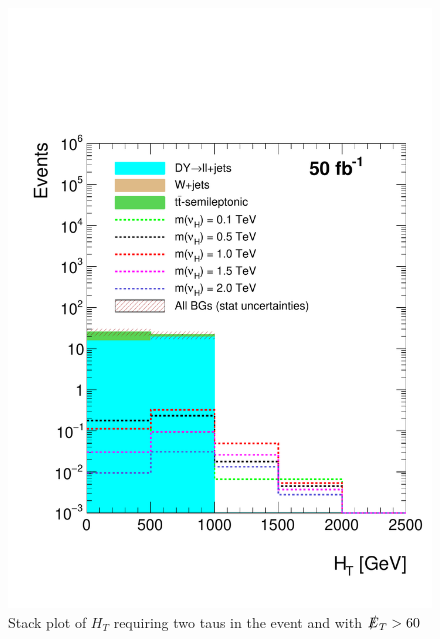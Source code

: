 \begin{figure}[H]
\centering
\includegraphics[width=\linewidth]{StackPlots/HT_2Taus_met60_50ifb_2moreSignals.pdf}
\caption{Stack plot of $H_{T}$ requiring two taus in the event and with $\slashed{E}_{T} > 60$}
\label{fig: HT2tausMet60}
\end{figure}




